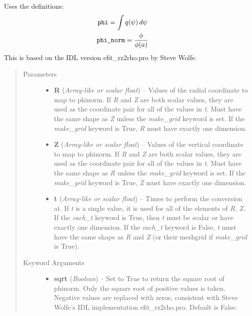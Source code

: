 \documentclass[letterpaper,10pt,english]{sphinxmanual}
\begin{document}
\begin{fulllineitems}
\begin{fulllineitems}
Uses the definitions:
\begin{gather}
\begin{split}\texttt{phi} &= \int q(\psi)\,d\psi\end{split}\notag\\\begin{split}\texttt{phi\_norm} &= \frac{\phi}{\phi(a)}\end{split}\notag
\end{gather}
This is based on the IDL version efit\_rz2rho.pro by Steve Wolfe.
\begin{quote}\begin{description}
\item[{Parameters}] \leavevmode\begin{itemize}
\item {} 
\textbf{R} (\emph{Array-like or scalar float}) --
Values of the radial coordinate to
map to phinorm. If \emph{R} and \emph{Z} are both scalar values,
they are used as the coordinate pair for all of the values in
\emph{t}. Must have the same shape as \emph{Z} unless the \emph{make\_grid}
keyword is set. If the \emph{make\_grid} keyword is True, \emph{R} must
have exactly one dimension.

\item {} 
\textbf{Z} (\emph{Array-like or scalar float}) --
Values of the vertical coordinate to
map to phinorm. If \emph{R} and \emph{Z} are both scalar values,
they are used as the coordinate pair for all of the values in
\emph{t}. Must have the same shape as \emph{R} unless the \emph{make\_grid}
keyword is set. If the \emph{make\_grid} keyword is True, \emph{Z} must
have exactly one dimension.

\item {} 
\textbf{t} (\emph{Array-like or scalar float}) --
Times to perform the conversion at.
If \emph{t} is a single value, it is used for all of the elements of
\emph{R}, \emph{Z}. If the \emph{each\_t} keyword is True, then \emph{t} must be
scalar or have exactly one dimension. If the \emph{each\_t} keyword is
False, \emph{t} must have the same shape as \emph{R} and \emph{Z} (or their
meshgrid if \emph{make\_grid} is True).

\end{itemize}

\item[{Keyword Arguments}] \leavevmode\begin{itemize}
\item {} 
\textbf{sqrt} (\emph{Boolean}) --
Set to True to return the square root of phinorm.
Only the square root of positive values is taken. Negative
values are replaced with zeros, consistent with Steve Wolfe's
IDL implementation efit\_rz2rho.pro. Default is False.


\end{itemize}
\end{description}
\end{quote}
\end{fulllineitems}
\end{fulllineitems}
\end{document}
